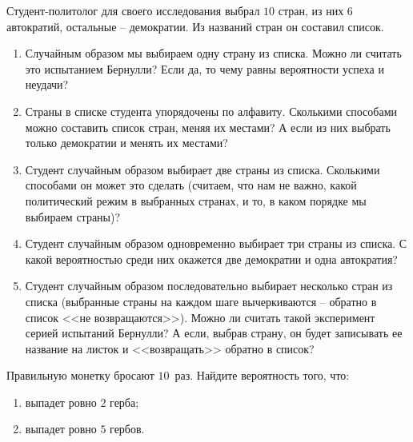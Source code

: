 \documentclass[a4paper, 12pt]{article}
\begin{document}
\begin{problem}
Студент-политолог для своего исследования выбрал $10$ стран, из 
них $6$ автократий, 
остальные -- демократии. Из названий стран он составил список. 
\begin{enumerate}
\item Случайным образом мы выбираем одну страну из списка. 
Можно ли считать это испытанием Бернулли? Если да, то чему 
равны вероятности успеха и неудачи?
\item Страны в списке студента упорядочены по алфавиту. 
Сколькими способами можно составить список стран, меняя их местами? 
А если из них выбрать только демократии и менять их местами? 
\item Студент случайным образом выбирает две страны из списка. 
Сколькими способами он может это сделать (считаем, что нам не важно, 
какой политический режим в выбранных странах, и то, в каком порядке 
мы выбираем страны)?
\item Студент случайным образом одновременно выбирает три страны 
из списка. С какой вероятностью среди них окажется две демократии и 
одна автократия?
\item Студент случайным образом последовательно выбирает 
несколько стран из списка (выбранные страны на каждом шаге 
вычеркиваются -- обратно в список <<не возвращаются>>). Можно 
ли считать такой эксперимент серией испытаний Бернулли? А если, 
выбрав страну, он будет записывать ее название на листок и 
<<возвращать>> обратно в список?
\end{enumerate}
\end{problem}

\begin{problem}
Правильную монетку бросают $10$~раз. Найдите вероятность 
того, что:
\begin{enumerate}
\item выпадет ровно $2$ герба;
\item выпадет ровно $5$ гербов.
\end{enumerate}
\end{problem}
\end{document}
